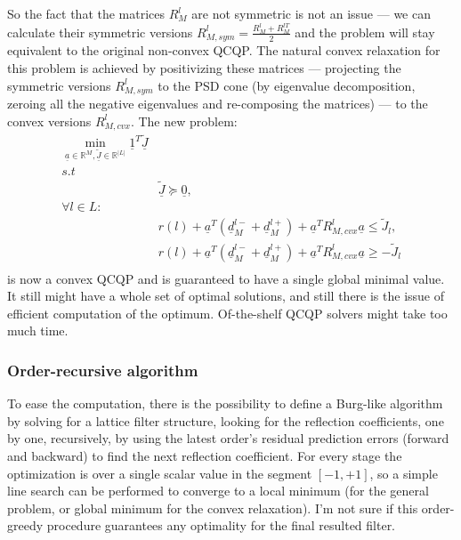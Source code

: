 \documentclass[journal,onecolumn]{IEEEtran}
\newcommand{\field}[1]{\mathbb{#1}}
\begin{document}
So the fact that the matrices $R_M^l$ are not symmetric is not an issue --- we can calculate their symmetric versions $R_{M,sym}^l=\frac{R_M^l + R_M^{lT}}{2}$ and the problem will stay equivalent to the original non-convex QCQP.
The natural convex relaxation for this problem is achieved by positivizing these matrices --- projecting the symmetric versions $R_{M,sym}^l$ to the PSD cone (by eigenvalue decomposition, zeroing all the negative eigenvalues and re-composing the matrices) --- to the convex versions $R_{M,cvx}^l$.
The new problem:
\begin{align*}
\min\limits_{\underline{a}\in\field{R}^M,\underline{\widetilde{J}}\in\field{R}^{|L|}} \underline{1}^T \underline{\widetilde{J}} & \\
s.t & \\
& \underline{\widetilde{J}}\succeq \underline{0}, \\
\forall l\in L: & \\
& r(l) + \underline{a}^T\left( \underline{d}_M^{l-} + \underline{d}_M^{l+} \right) + \underline{a}^T R_{M,cvx}^l\underline{a} \leq \widetilde{J}_l, \\
& r(l) + \underline{a}^T\left( \underline{d}_M^{l-} + \underline{d}_M^{l+} \right) + \underline{a}^T R_{M,cvx}^l\underline{a} \geq -\widetilde{J}_l \\
\end{align*}
is now a convex QCQP and is guaranteed to have a single global minimal value.
It still might have a whole set of optimal solutions, and still there is the issue of efficient computation of the optimum. Of-the-shelf QCQP solvers might take too much time.

\subsubsection{Order-recursive algorithm}
To ease the computation, there is the possibility to define a Burg-like algorithm by solving for a lattice filter structure, looking for the reflection coefficients, one by one, recursively, by using the latest order's residual prediction errors (forward and backward) to find the next reflection coefficient.
For every stage the optimization is over a single scalar value in the segment $\left[ -1,+1\right]$, so a simple line search can be performed to converge to a local minimum (for the general problem, or global minimum for the convex relaxation).
I'm not sure if this order-greedy procedure guarantees any optimality for the final resulted filter.

\end{document}
